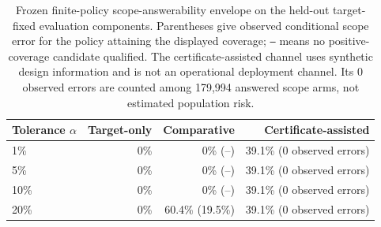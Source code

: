 \begin{table}[!ht]
\centering
\caption{Frozen finite-policy scope-answerability envelope on the
held-out target-fixed evaluation components. Parentheses give observed
conditional scope error for the policy attaining the displayed coverage;
\texttt{--} means no positive-coverage candidate qualified. The
certificate-assisted channel uses synthetic design information and is not
an operational deployment channel. Its 0 observed errors are counted
among 179,994 answered scope arms, not estimated
population risk.}
\label{tab:v05-frontier}
\small
\begin{tabular}{lrrr}
\toprule
Tolerance $\alpha$ & Target-only & Comparative & Certificate-assisted \\
\midrule
1\% & 0\% & 0\% (--) & 39.1\% (0 observed errors) \\
5\% & 0\% & 0\% (--) & 39.1\% (0 observed errors) \\
10\% & 0\% & 0\% (--) & 39.1\% (0 observed errors) \\
20\% & 0\% & 60.4\% (19.5\%) & 39.1\% (0 observed errors) \\
\bottomrule
\end{tabular}
\end{table}

